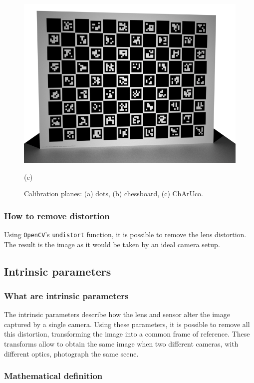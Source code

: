 \begin{figure}
	\includegraphics[width=\linewidth]{images/calib-charuco.png}
	\caption*{(c)}
	\endminipage
	\caption{Calibration planes: (a) dots, (b) chessboard, (c) ChArUco.}\label{fig:calibration-planes}
\end{figure}

\subsubsection{How to remove distortion}
Using \texttt{OpenCV}'s \texttt{undistort} function, it is possible to remove the lens distortion.
The result is the image as it would be taken by an ideal camera setup.

\subsection[Intrinsic parameters]{Intrinsic parameters~\cite{calib-intrinsics}}

\subsubsection{What are intrinsic parameters}

The intrinsic parameters describe how the lens and sensor alter the image captured by a single camera.
Using these parameters, it is possible to remove all this distortion, transforming the image into a common frame of reference.
These transforms allow to obtain the same image when two different cameras, with different optics, photograph the same scene.

\subsubsection{Mathematical definition}

